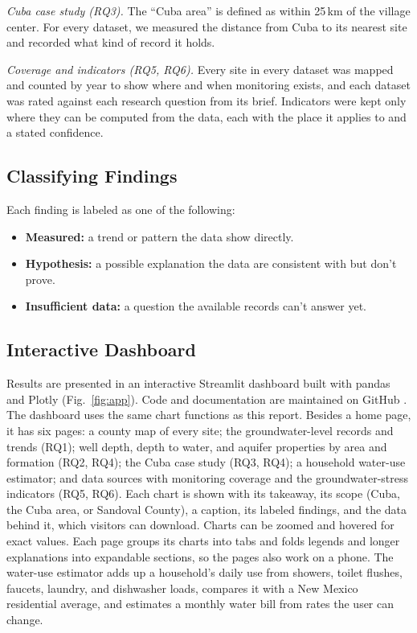 \documentclass[10pt,twocolumn,letterpaper]{article}
\begin{document}
\emph{Cuba case study (RQ3).} The ``Cuba area'' is defined as within 25\,km of the village center.
For every dataset, we measured the distance from Cuba to its nearest site and recorded what kind of
record it holds.

\emph{Coverage and indicators (RQ5, RQ6).} Every site in every dataset was mapped and counted by
year to show where and when monitoring exists, and each dataset was rated against each research
question from its brief. Indicators were kept only where they can be computed from the data, each
with the place it applies to and a stated confidence.

\subsection{Classifying Findings}
Each finding is labeled as one of the following:
\begin{itemize}
  \item \textbf{Measured:} a trend or pattern the data show directly.
  \item \textbf{Hypothesis:} a possible explanation the data are consistent with but don't prove.
  \item \textbf{Insufficient data:} a question the available records can't answer yet.
\end{itemize}

\subsection{Interactive Dashboard}
Results are presented in an interactive Streamlit dashboard built with pandas and Plotly
(Fig.~\ref{fig:app}). Code and documentation are maintained on GitHub \citep{team23_repo}. The
dashboard uses the same chart functions as this report. Besides a home page, it has six pages: a
county map of every site; the groundwater-level records and trends (RQ1); well depth, depth to
water, and aquifer properties by area and formation (RQ2, RQ4); the Cuba case study (RQ3, RQ4); a
household water-use estimator; and data sources with monitoring coverage and the
groundwater-stress indicators (RQ5, RQ6). Each chart is shown with its takeaway, its scope (Cuba,
the Cuba area, or Sandoval County), a caption, its labeled findings, and the data behind it, which
visitors can download. Charts can be zoomed and hovered for exact values. Each page groups its
charts into tabs and folds legends and longer explanations into expandable sections, so the pages
also work on a phone. The water-use estimator adds up a household's daily use from showers, toilet
flushes, faucets, laundry, and dishwasher loads, compares it with a New Mexico residential average,
and estimates a monthly water bill from rates the user can change.
\end{document}
